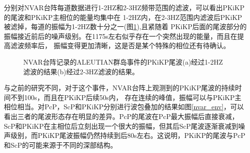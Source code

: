 分别对NVAR台阵每道数据进行1-2HZ和2-3HZ频带范围的滤波，可以看出PKiKP的尾波和PKiKP主相位的能量均集中在
1-2HZ内，在2-3HZ范围内滤波后PKiKP被滤掉，每道的振幅为1-2HZ数十分之一(图\ref{nvar_sec}),且紧随着
PKiKP后面的尾波部分的振幅接近前后的噪声级别。在1175s左右似乎存在一个突然出现的能量，而且在提高滤波频率后，
振幅变得更加清晰，这是否是某个特殊的相位还有待确认。

\begin{figure}
\hfill{}
\hfill{}
\hfill{}
\caption{NVAR台阵记录的ALEUTIAN群岛事件的PKiKP尾波(a)经过1-2HZ滤波的结果(b)经过2-3HZ滤波的结果。}
\label{nvar_sec}
\end{figure}


与之前的研究不同，对于这个事件，NVAR台阵上观测到的PKiKP尾波的持续时间不到100s，而且在PKiKP后续50s内，
存在连续的峰值，振幅可以与PKiKP主相位相当。对PcP，ScP和PKiKP分别进行波包叠加的结果如图\ref{nvar_env}，可以看出三者的尾波形态存在明显的差异。PcP的尾波在PcP最大振幅后直接衰减，ScP和PKiKP在主相位后立刻出现一个很大的振幅，但其后ScP尾波逐渐衰减到噪声级别，而PKiKP尾波振幅仍然持续到后80s左右。这说明，PKiKP的尾波与PcP和ScP的可能来源于不同的深部结构。

